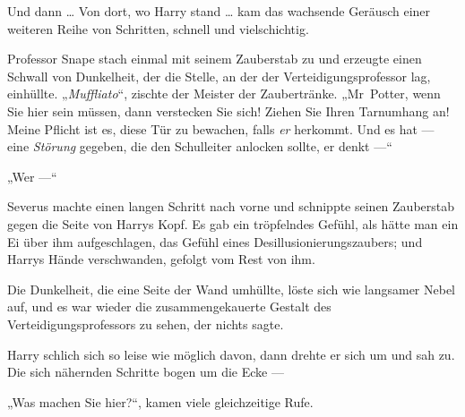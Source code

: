 Und dann … Von dort, wo Harry stand … kam das wachsende Geräusch einer weiteren Reihe von Schritten, schnell und vielschichtig.

Professor Snape stach einmal mit seinem Zauberstab zu und erzeugte einen Schwall von Dunkelheit, der die Stelle, an der der Verteidigungsprofessor lag, einhüllte.
„\emph{Muffliato}“, zischte der Meister der Zaubertränke.
„Mr~Potter, wenn Sie hier sein müssen, dann verstecken Sie sich! Ziehen Sie Ihren Tarnumhang an! Meine Pflicht ist es, diese Tür zu bewachen, falls \emph{er} herkommt. Und es hat — eine \emph{Störung} gegeben, die den Schulleiter anlocken sollte, er denkt —“

„Wer —“

Severus machte einen langen Schritt nach vorne und schnippte seinen Zauberstab gegen die Seite von Harrys Kopf. Es gab ein tröpfelndes Gefühl, als hätte man ein Ei über ihm aufgeschlagen, das Gefühl eines Desillusionierungszaubers; und Harrys Hände verschwanden, gefolgt vom Rest von ihm.

Die Dunkelheit, die eine Seite der Wand umhüllte, löste sich wie langsamer Nebel auf, und es war wieder die zusammengekauerte Gestalt des Verteidigungsprofessors zu sehen, der nichts sagte.

Harry schlich sich so leise wie möglich davon, dann drehte er sich um und sah zu. Die sich nähernden Schritte bogen um die Ecke —

„Was machen Sie hier?“, kamen viele gleichzeitige Rufe.

